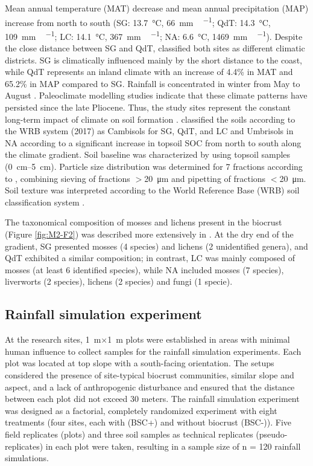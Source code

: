 Mean annual temperature (MAT) decrease and mean annual precipitation (MAP) increase from north to south (SG: \SI{13.7}{\degreeCelsius}, \SI{66}{\milli\metre\,\year^{-1}}; QdT: \SI{14.3}{\degreeCelsius}, \SI{109}{\milli\metre\,\year^{-1}}; LC: \SI{14.1}{\degreeCelsius}, \SI{367}{\milli\metre\,\year^{-1}}; NA: \SI{6.6}{\degreeCelsius}, \SI{1469}{\milli\metre\,\year^{-1}}). Despite the close distance between SG and QdT, \citet{Santibnez2017} classified both sites as different climatic districts. SG is climatically influenced mainly by the short distance to the coast, while QdT represents an inland climate with an increase of 4.4\% in MAT and 65.2\% in MAP compared to SG. Rainfall is concentrated in winter from May to August \citep{Bernhard2018,Canessa2020}. Paleoclimate modelling studies \citep{Mutz2018} indicate that these climate patterns have persisted since the late Pliocene. Thus, the study sites represent the constant long-term impact of climate on soil formation \citep{Ewing2006}. \citet{Bernhard2018} classified the soils according to the WRB system (2017) as Cambisols for SG, QdT, and LC and Umbrisols in NA according to a significant increase in topsoil SOC from north to south along the climate gradient. Soil baseline was characterized by \citet{RiverasMunoz2022} using topsoil samples (\SIrange[range-phrase=--,range-units=single]{0}{5}{\centi\meter}). Particle size distribution was determined for 7 fractions according to \citet{Kohn1929}, combining sieving of fractions $>$\SI{20}{\micro\meter} and pipetting of fractions $<$\SI{20}{\micro\meter}. Soil texture was interpreted according to the World Reference Base (WRB) soil classification system \citep{Jahn2006}.

The taxonomical composition of mosses and lichens present in the biocrust (Figure \ref{fig:M2-F2}) was described more extensively in \citep{RiverasMunoz2022}. At the dry end of the gradient, SG presented mosses (4 species) and lichens (2 unidentified genera), and QdT exhibited a similar composition; in contrast, LC was mainly composed of mosses (at least 6 identified species), while NA included mosses (7 species), liverworts (2 species), lichens (2 species) and fungi (1 specie).

\subsection{Rainfall simulation experiment}

At the research sites, \SI{1}{\meter}\(\times\)\SI{1}{\meter} plots were established in areas with minimal human influence to collect samples for the rainfall simulation experiments. Each plot was located at top slope with a south-facing orientation. The setups considered the presence of site-typical biocrust communities, similar slope and aspect, and a lack of anthropogenic disturbance and ensured that the distance between each plot did not exceed 30 meters. The rainfall simulation experiment was designed as a factorial, completely randomized experiment with eight treatments (four sites, each with (BSC+) and without biocrust (BSC-)). Five field replicates (plots) and three soil samples as technical replicates (pseudo-replicates) in each plot were taken, resulting in a sample size of n = 120 rainfall simulations.


